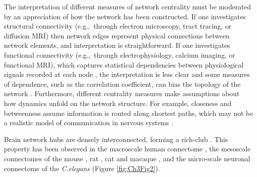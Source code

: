 The interpretation of different measures of network centrality must be moderated by an appreciation of how the network has been constructed. If one investigates structural connectivity \mbox{(e.g., through} electron microscopy, tract tracing, or diffusion MRI) then network edges represent physical connections between network elements, and interpretation is straightforward. If one investigates functional connectivity \mbox{(e.g., through} electrophysiology, calcium imaging, or functional MRI), which captures statistical dependencies between physiological signals recorded at each node \citep{Friston1994}, the interpretation is less clear and some measures of dependence, such as the correlation coefficient, can bias the topology of the network \citep{Power2011,Zalesky2012}. Furthermore, different centrality measures make assumptions about how dynamics unfold on the network structure. For example, closeness and betweenness assume information is routed along shortest paths, which may not be a realistic model of communication in nervous systems \citep{Goni2014,Misic2015a,Seguin2018}.

Brain network hubs are densely interconnected, forming a rich-club \citep{Colizza2006}. This property has been observed in the macroscale human connectome \citep{VandenHeuvel2011}, the mesoscale connectomes of the mouse \citep{Fulcher2016}, rat \citep{VandenHeuvel2016b}, cat \citep{DeReus2013b} and macaque \citep{Harriger2012}, and the micro-scale neuronal connectome of the \textit{C.elegans} \citep{Towlson2013} (Figure \ref{fig:Ch3Fig2}).

